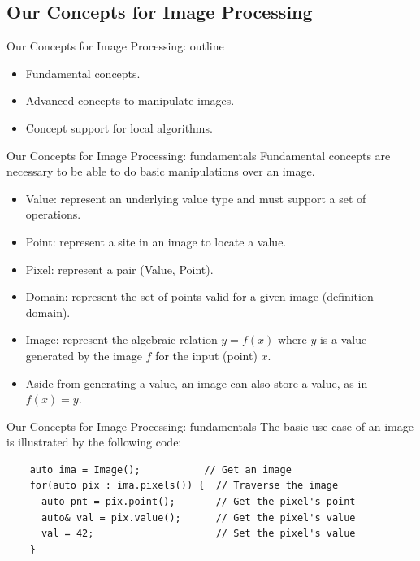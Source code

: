 \documentclass[12pt,aspectratio=169]{beamer}
\begin{document}
\subsection[Our Concepts for Image Processing]{Our Concepts for Image Processing}

\begin{frame}[fragile]{Our Concepts for Image Processing: outline}
  \begin{itemize}
    \item Fundamental concepts.
    \item Advanced concepts to manipulate images.
    \item Concept support for local algorithms.
  \end{itemize}
\end{frame}

\begin{frame}[fragile]{Our Concepts for Image Processing: fundamentals}
  Fundamental concepts are necessary to be able to do basic manipulations over an image.
  \begin{itemize}
    \item Value: represent an underlying value type and must support a set of operations.
    \item Point: represent a site in an image to locate a value.
    \item Pixel: represent a pair (Value, Point).
    \item Domain: represent the set of points valid for a given image (definition domain).
    \item Image: represent the algebraic relation \(y = f(x)\) where \(y\) is a value generated by the image \(f\) for
          the input (point) \(x\).
    \item Aside from generating a value, an image can also store a value, as in \(f(x) = y\).
  \end{itemize}
\end{frame}

\begin{frame}[fragile]{Our Concepts for Image Processing: fundamentals}
  The basic use case of an image is illustrated by the following code:
  \begin{verbatim}
    auto ima = Image();           // Get an image
    for(auto pix : ima.pixels()) {  // Traverse the image
      auto pnt = pix.point();       // Get the pixel's point
      auto& val = pix.value();      // Get the pixel's value
      val = 42;                     // Set the pixel's value
    }
  \end{verbatim}
\end{frame}
\end{document}
